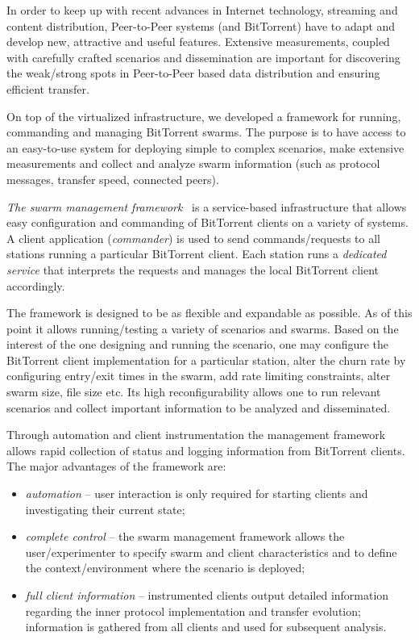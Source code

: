 In order to keep up with recent advances in Internet technology, streaming and
content distribution, Peer-to-Peer systems (and BitTorrent) have to adapt and
develop new, attractive and useful features. Extensive measurements, coupled
with carefully crafted scenarios and dissemination are important for
discovering the weak/strong spots in Peer-to-Peer based data distribution and
ensuring efficient transfer.

On top of the virtualized infrastructure, we developed a framework for
running, commanding and managing BitTorrent swarms. The purpose is to have
access to an easy-to-use system for deploying simple to complex scenarios, make
extensive measurements and collect and analyze swarm information (such as
protocol messages, transfer speed, connected peers).

\textit{The swarm management framework}~\cite{swarm-management} is a service-based infrastructure that
allows easy configuration and commanding of BitTorrent clients on a variety of
systems. A client application (\textit{commander}) is used to send
commands/requests to all stations running a particular BitTorrent client. Each
station runs a \textit{dedicated service} that interprets the requests and
manages the local BitTorrent client accordingly.

The framework is designed to be as flexible and expandable as possible. As of
this point it allows running/testing a variety of scenarios and swarms. Based
on the interest of the one designing and running the scenario, one may
configure the BitTorrent client implementation for a particular station, alter
the churn rate by configuring entry/exit times in the swarm, add rate limiting
constraints, alter swarm size, file size etc. Its high reconfigurability
allows one to run relevant scenarios and collect important information to be
analyzed and disseminated.

Through automation and client instrumentation the management framework allows
rapid collection of status and logging information from BitTorrent clients.
The major advantages of the framework are:

\begin{itemize}
  \item \textit{automation} -- user interaction is only required for starting
  clients and investigating their current state;
  \item \textit{complete control} -- the swarm management framework allows the
  user/experimenter to specify swarm and client characteristics and to define
  the context/environment where the scenario is deployed;
  \item \textit{full client information} -- instrumented clients output
  detailed information regarding the inner protocol implementation and
  transfer evolution; information is gathered from all clients and used for
  subsequent analysis.
\end{itemize}

